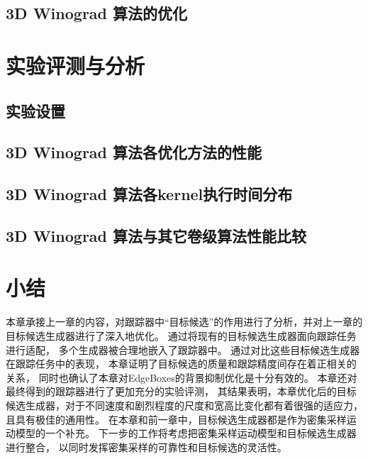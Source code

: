 \subsection{3D Winograd 算法的优化}


\section{实验评测与分析}
\subsection{实验设置}


\subsection{3D Winograd 算法各优化方法的性能}


\subsection{3D Winograd 算法各kernel执行时间分布}


\subsection{3D Winograd 算法与其它卷级算法性能比较}




\section{小结}
本章承接上一章的内容，对跟踪器中``目标候选''的作用进行了分析，并对上一章的目标候选生成器进行了深入地优化。
通过将现有的目标候选生成器面向跟踪任务进行适配，
多个生成器被合理地嵌入了跟踪器中。
通过对比这些目标候选生成器在跟踪任务中的表现，
本章证明了目标候选的质量和跟踪精度间存在着正相关的关系，
同时也确认了本章对EdgeBoxes的背景抑制优化是十分有效的。
本章还对最终得到的跟踪器进行了更加充分的实验评测，
其结果表明，本章优化后的目标候选生成器，对于不同速度和剧烈程度的尺度和宽高比变化都有着很强的适应力，
且具有极佳的通用性。
在本章和前一章中，目标候选生成器都是作为密集采样运动模型的一个补充。
下一步的工作将考虑把密集采样运动模型和目标候选生成器进行整合，
以同时发挥密集采样的可靠性和目标候选的灵活性。
